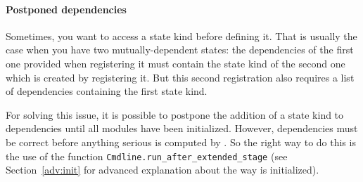 
\paragraph{Postponed dependencies}

Sometimes, you want to access a state kind before defining it. That is
usually the case when you have two mutually-dependent states: the dependencies
of the first one provided when registering it must contain the state kind of
the second one which is created by registering it. But this second registration
also requires a list of dependencies containing the first state kind.

For solving this issue, it is possible to postpone the addition of a
state kind to dependencies until all modules have been initialized. However,
dependencies must be correct before anything serious is computed by \framac. So
the right way to do this is the use of the function
\texttt{Cmdline.run\_after\_extended\_stage}%
 (see
Section~\ref{adv:init} for advanced explanation about the way \framac is
initialized).
